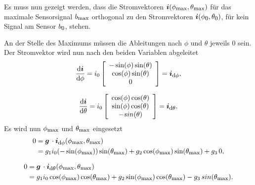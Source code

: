    Es muss nun gezeigt werden, dass die Stromvektoren $\mbox{\boldmath ${i}$}(\phi_{\textrm{\footnotesize{max}}},\theta_{\textrm{\footnotesize{max}}})$ für das maximale Sensorsignal $b_{\textrm{\footnotesize{max}}}$ orthogonal zu den Stromvektoren $\mbox{\boldmath ${i}$}(\phi_{\textrm{\footnotesize{0}}},\theta_{\textrm{\footnotesize{0}}})$, für kein Signal am Sensor $b_{\textrm{\footnotesize{0}}}$, stehen. 

   An der Stelle des Maximums müssen die Ableitungen nach $\phi$ und $\theta$ jeweils 0 sein. Der Stromvektor wird nun nach den beiden Variablen abgeleitet
   \begin{equation}
      \frac{\text{d}\mbox{\boldmath ${i}$}}{\text{d}\phi}  = i_0 \left[\begin{array}{c} -\sin(\phi) \sin(\theta)\\ \cos(\phi)\sin(\theta )\\ 0 \end{array}\right] = \mbox{\boldmath ${i}$}_{\textrm{\footnotesize{d$\phi$}}},
      \label{eq:DiffPhiCurr}
   \end{equation}

   \begin{equation}
      \frac{\text{d}\mbox{\boldmath ${i}$}}{\text{d}\theta}  = i_0 \left[\begin{array}{c} \cos(\phi) \cos(\theta)\\ \sin(\phi)\cos(\theta )\\ -sin(\theta) \end{array}\right] = \mbox{\boldmath ${i}$}_{\textrm{\footnotesize{d$\theta$}}} .
      \label{eq:DiffThetaCurr}
   \end{equation}
   Es wird nun $\phi_{\textrm{\footnotesize{max}}}$ und $\theta_{\textrm{\footnotesize{max}}}$ eingesetzt
   \begin{equation}
      \begin{split}
         0 &=\mbox{\boldmath ${g}$} \,\cdot\mbox{\boldmath ${i}$}_{\textrm{\footnotesize{d$\phi$}}}(\phi_{\textrm{\footnotesize{max}}},\theta_{\textrm{\footnotesize{max}}}) \\ &= g_{1}  i_0 (-\sin(\phi_{\textrm{\footnotesize{max}}})) \sin(\theta_{\textrm{\footnotesize{max}}}) + g_{2}  \cos(\phi_{\textrm{\footnotesize{max}}})\sin(\theta_{\textrm{\footnotesize{max}}}) + g_{3} \, 0,
         \label{eq:DiffPhieq0}
      \end{split}
   \end{equation}

   \begin{equation}
      \begin{split}
         0 &=\mbox{\boldmath ${g}$} \,\cdot\mbox{\boldmath ${i}$}_{\textrm{\footnotesize{d$\theta$}}}(\phi_{\textrm{\footnotesize{max}}},\theta_{\textrm{\footnotesize{max}}}) \\ &= g_{1}  i_0 \cos(\phi_{\textrm{\footnotesize{max}}}) \cos(\theta_{\textrm{\footnotesize{max}}}) + g_{2}  \sin(\phi_{\textrm{\footnotesize{max}}})\cos(\theta_{\textrm{\footnotesize{max}}}) - g_{3} \, sin(\theta_{\textrm{\footnotesize{max}}}).
         \label{eq:DiffThetaeq0}
      \end{split}
   \end{equation}


